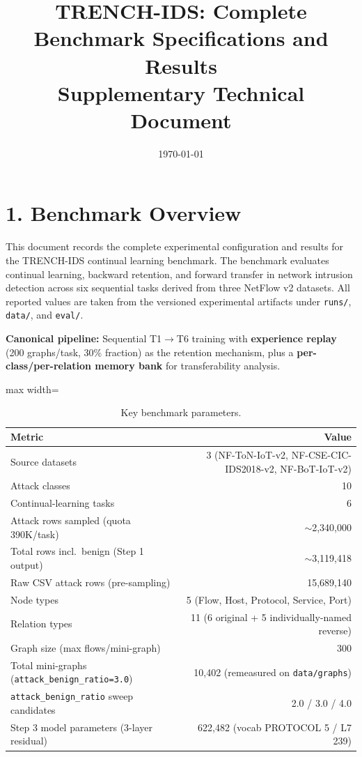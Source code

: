 \documentclass[11pt,a4paper]{article}
\title{TRENCH-IDS: Complete Benchmark Specifications and Results\\Supplementary Technical Document}
\author{}
\date{\today}
\begin{document}
\maketitle

\section*{1. Benchmark Overview}
This document records the complete experimental configuration and results for the TRENCH-IDS continual learning benchmark. The benchmark evaluates continual learning, backward retention, and forward transfer in network intrusion detection across six sequential tasks derived from three NetFlow v2 datasets. All reported values are taken from the versioned experimental artifacts under \texttt{runs/}, \texttt{data/}, and \texttt{eval/}.

\textbf{Canonical pipeline:} Sequential T1$\to$T6 training with \textbf{experience replay} (200 graphs/task, 30\% fraction) as the retention mechanism, plus a \textbf{per-class/per-relation memory bank} for transferability analysis.

\begin{table}[H]
\centering
\caption{Key benchmark parameters.}
\label{tab:benchmark-overview}
\begin{adjustbox}{max width=\textwidth}
\begin{tabular}{lr}
\toprule
Metric & Value \\
\midrule
Source datasets & 3 (NF-ToN-IoT-v2, NF-CSE-CIC-IDS2018-v2, NF-BoT-IoT-v2) \\
Attack classes & 10 \\
Continual-learning tasks & 6 \\
Attack rows sampled (quota 390K/task) & $\sim$2,340,000 \\
Total rows incl.\ benign (Step 1 output) & $\sim$3,119,418 \\
Raw CSV attack rows (pre-sampling) & 15,689,140 \\
Node types & 5 (Flow, Host, Protocol, Service, Port) \\
Relation types & 11 (6 original + 5 individually-named reverse) \\
Graph size (max flows/mini-graph) & 300 \\
Total mini-graphs (\texttt{attack\_benign\_ratio=3.0}) & 10,402 (remeasured on \texttt{data/graphs}) \\
\texttt{attack\_benign\_ratio} sweep candidates & 2.0 / 3.0 / 4.0 \\
Step 3 model parameters (3-layer residual) & 622,482 (vocab PROTOCOL 5 / L7 239) \\
\bottomrule
\end{tabular}
\end{adjustbox}
\end{table}
\end{document}
